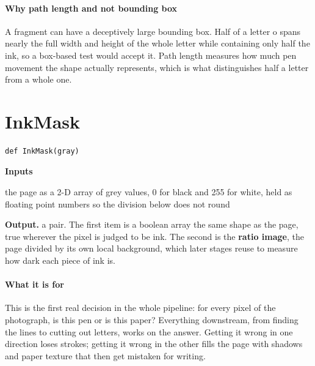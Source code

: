 \paragraph{Why path length and not bounding box}
A fragment can have a deceptively large bounding box. Half of a letter o spans nearly the full width and height of the whole letter while containing only half the ink, so a box-based test would accept it. Path length measures how much pen movement the shape actually represents, which is what distinguishes half a letter from a whole one.


\section{InkMask}
\begin{lstlisting}[style=sig]
def InkMask(gray)
\end{lstlisting}

\noindent\textbf{Inputs}
\begin{description}[leftmargin=2.2em,style=nextline,font=\normalfont\ttfamily]\setlength\itemsep{1pt}
  \item[{gray}] \normalfont the page as a 2-D array of grey values, 0 for black and 255 for white, held as floating point numbers so the division below does not round
\end{description}

\noindent\textbf{Output.} a pair. The first item is a boolean array the same shape as the page, true wherever the pixel is judged to be ink. The second is the \textbf{ratio image}, the page divided by its own local background, which later stages reuse to measure how dark each piece of ink is.


\paragraph{What it is for}
This is the first real decision in the whole pipeline: for every pixel of the photograph, is this pen or is this paper? Everything downstream, from finding the lines to cutting out letters, works on the answer. Getting it wrong in one direction loses strokes; getting it wrong in the other fills the page with shadows and paper texture that then get mistaken for writing.


